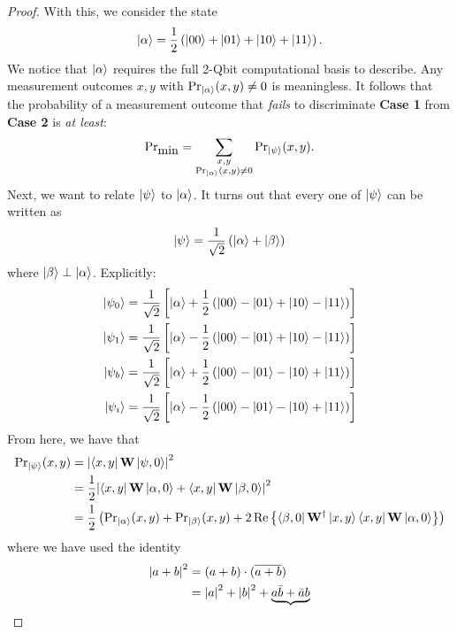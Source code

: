 \documentclass{book}
\theoremstyle{definition}
\newcommand{\nn}{\nonumber}
\newcommand{\al}{\alpha}
\newcommand{\be}{\beta}
\newcommand{\f}[2]{\frac{#1}{#2}}
\newcommand{\lp}{\left(}
\newcommand{\rp}{\right)}
\newcommand{\lb}{\left[}
\newcommand{\rb}{\right]}
\newcommand{\lc}{\left\{}
\newcommand{\rc}{\right\}}
\begin{document}
\begin{enumerate}[(a)]
\begin{proof}
		With this, we consider the state
		\begin{align}
		\ket{\al} = \f{1}{2}\lp \ket{00} + \ket{01} + \ket{10} + \ket{11}  \rp.
		\end{align}
		We notice that $\ket{\al}$ requires the full 2-Qbit computational basis to describe. Any measurement outcomes $x,y$ with $ {\Pr}_{\ket{\al}} (x,y) \neq 0$ is meaningless. It follows that the probability of a measurement outcome that \textit{fails} to discriminate \textbf{Case 1} from \textbf{Case 2} is \textit{at least}:
		\begin{align}
		{\Pr}_{\mbox{min}} = \sum\limits_{\substack{x,y\\{\Pr}_{\ket{\al}} (x,y) \neq 0}} {\Pr}_{\ket{\psi}} (x,y).
		\end{align}
		Next, we want to relate $\ket{\psi}$ to $\ket{\al}$. It turns out that every one of $\ket{\psi}$ can be written as
		\begin{align}
		\ket{\psi} = \f{1}{\sqrt{2}}\lp \ket{\al} + \ket{\be} \rp
		\end{align}
		where $\ket{\be} \perp \ket{\al}$. Explicitly:
		\begin{align}
		\ket{\psi_0} = \f{1}{\sqrt{2}}\lb \ket{\al} + \f{1}{2}\lp \ket{00} - \ket{01} + \ket{10} - \ket{11}  \rp   \rb\nn\\
		\ket{\psi_1} = \f{1}{\sqrt{2}}\lb \ket{\al} - \f{1}{2}\lp \ket{00} - \ket{01} + \ket{10} - \ket{11}  \rp  \rb\nn\\
		\ket{\psi_b} = \f{1}{\sqrt{2}}\lb \ket{\al} + \f{1}{2}\lp \ket{00} - \ket{01} - \ket{10} + \ket{11}  \rp   \rb\nn\\
		\ket{\psi_i} = \f{1}{\sqrt{2}}\lb \ket{\al} - \f{1}{2}\lp \ket{00} - \ket{01} - \ket{10} + \ket{11}  \rp    \rb
		\end{align}
		From here, we have that
		\begin{align}
		{\Pr}_{\ket{\psi}} (x,y) &= \abs{\bra{x,y} \mathbf{W}\ket{\psi,0}}^2 \nn\\
		&= \f{1}{2}\abs{\bra{x,y} \mathbf{W}\ket{\al,0} + \bra{x,y} \mathbf{W}\ket{\be,0}}^2\nn\\
		&= \f{1}{2}\lp {\Pr}_{\ket{\al}}(x,y) + {\Pr}_{\ket{\be}}(x,y) + 2\Re\lc \bra{\be,0}\mathbf{W}^\dagger\ket{x,y}\bra{x,y}\mathbf{W}\ket{\al,0}  \rc  \rp
		\end{align}
		where we have used the identity
		\begin{align}
		\abs{a+b}^2 &= (a+b)\cdot(\overline{a+b})\nn\\
		&= \abs{a}^2 + \abs{b}^2 + \underbrace{a\bar{b} + \bar{a}b}\nn\\

\end{align}
\end{proof}
\end{enumerate}
\end{document}
